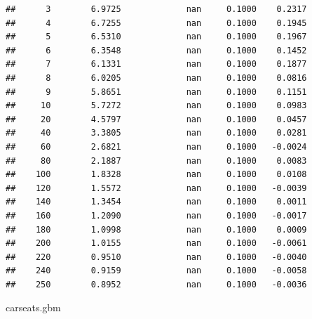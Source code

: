 \documentclass[]{book}
\newenvironment{Shaded}{\begin{snugshade}}{\end{snugshade}}
\newcommand{\NormalTok}[1]{#1}
\begin{document}
\begin{verbatim}
##      3        6.9725             nan     0.1000    0.2317
##      4        6.7255             nan     0.1000    0.1945
##      5        6.5310             nan     0.1000    0.1967
##      6        6.3548             nan     0.1000    0.1452
##      7        6.1331             nan     0.1000    0.1877
##      8        6.0205             nan     0.1000    0.0816
##      9        5.8651             nan     0.1000    0.1151
##     10        5.7272             nan     0.1000    0.0983
##     20        4.5797             nan     0.1000    0.0457
##     40        3.3805             nan     0.1000    0.0281
##     60        2.6821             nan     0.1000   -0.0024
##     80        2.1887             nan     0.1000    0.0083
##    100        1.8328             nan     0.1000    0.0108
##    120        1.5572             nan     0.1000   -0.0039
##    140        1.3454             nan     0.1000    0.0011
##    160        1.2090             nan     0.1000   -0.0017
##    180        1.0998             nan     0.1000    0.0009
##    200        1.0155             nan     0.1000   -0.0061
##    220        0.9510             nan     0.1000   -0.0040
##    240        0.9159             nan     0.1000   -0.0058
##    250        0.8952             nan     0.1000   -0.0036
\end{verbatim}

\begin{Shaded}
\begin{Highlighting}[]
\NormalTok{carseats.gbm}
\end{Highlighting}
\end{Shaded}
\end{document}
